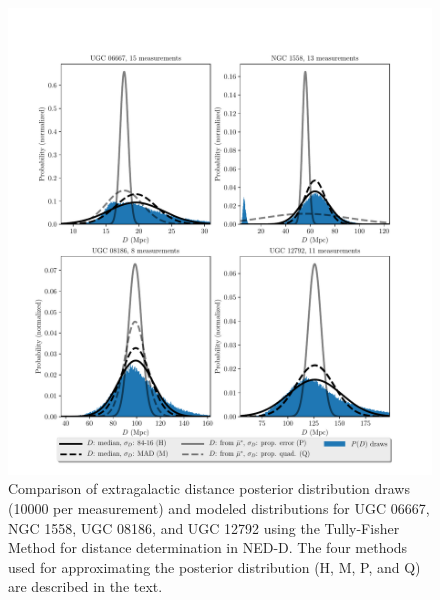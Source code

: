 \documentclass[a4paper,fleqn,usenatbib]{mnras}
\begin{document}
\begin{figure}

	\includegraphics[scale=0.7]{comp}
    \caption{Comparison of extragalactic distance posterior distribution draws (10000 per measurement) and modeled distributions for UGC 06667, NGC 1558, UGC 08186, and UGC 12792 using the Tully-Fisher Method for distance determination in NED-D. The four methods used for approximating the posterior distribution (H, M, P, and Q) are described in the text. }
    \label{fig:comp}
\end{figure}
\end{document}
